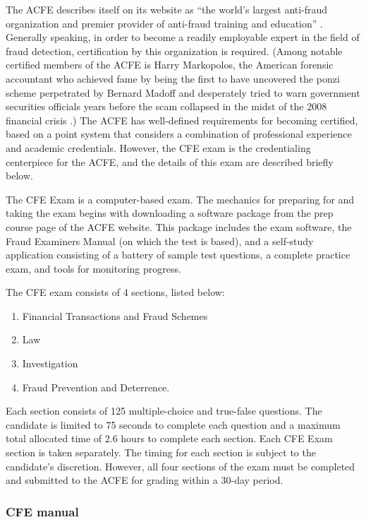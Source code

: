 The ACFE \cite{acfe} describes itself on its website as ``the world's largest anti-fraud organization and premier provider of anti-fraud training and education'' \cite{acfe}.  Generally speaking, in order to become a readily employable expert in the field of fraud detection, certification by this organization is required.  (Among notable certified members of the ACFE is Harry Markopolos, the American forensic accountant who achieved fame by being the first to have uncovered the ponzi scheme perpetrated by Bernard Madoff and desperately tried to warn government securities officials years before the scam collapsed in the midst of the 2008 financial crisis \cite{markopolos2010}.)  The ACFE has well-defined requirements for becoming certified, based on a point system that considers a combination of professional experience and academic credentials.  However, the CFE exam is the credentialing centerpiece for the ACFE, and the details of this exam are described briefly below.

The CFE Exam is a computer-based exam.  The mechanics for preparing for and taking the exam begins with downloading a software package from the prep course page of the ACFE website.  This package includes the exam software, the Fraud Examiners Manual (on which the test is based), and a self-study application consisting of a battery of sample test questions, a complete practice exam, and tools for monitoring progress.  

The CFE exam consists of 4 sections, listed below:

\begin{enumerate}
\item Financial Transactions and Fraud Schemes 
\item Law 
\item Investigation
\item Fraud Prevention and Deterrence.  
\end{enumerate}

Each section consists of 125 multiple-choice and true-false questions.  The candidate is limited to 75 seconds to complete each question and a maximum total allocated time of 2.6 hours to complete each section.  Each CFE Exam section is taken separately.  The timing for each section is subject to the candidate’s discretion.  However, all four sections of the exam must be completed and submitted to the ACFE for grading within a 30-day period.

\subsubsection{CFE manual}

